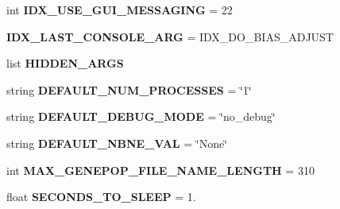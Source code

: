 \begin{DoxyCompactItemize}
\item 
int {\bfseries I\+D\+X\+\_\+\+U\+S\+E\+\_\+\+G\+U\+I\+\_\+\+M\+E\+S\+S\+A\+G\+I\+NG} = 22\hypertarget{namespacenegui_1_1pgdriveneestimator_a9f0371fe88418d9b181d7235ca747e73}{}\label{namespacenegui_1_1pgdriveneestimator_a9f0371fe88418d9b181d7235ca747e73}

\item 
{\bfseries I\+D\+X\+\_\+\+L\+A\+S\+T\+\_\+\+C\+O\+N\+S\+O\+L\+E\+\_\+\+A\+RG} = I\+D\+X\+\_\+\+D\+O\+\_\+\+B\+I\+A\+S\+\_\+\+A\+D\+J\+U\+ST\hypertarget{namespacenegui_1_1pgdriveneestimator_a1060cbbc63450dda6b048c88965edadd}{}\label{namespacenegui_1_1pgdriveneestimator_a1060cbbc63450dda6b048c88965edadd}

\item 
list {\bfseries H\+I\+D\+D\+E\+N\+\_\+\+A\+R\+GS}
\item 
string {\bfseries D\+E\+F\+A\+U\+L\+T\+\_\+\+N\+U\+M\+\_\+\+P\+R\+O\+C\+E\+S\+S\+ES} = \char`\"{}1\char`\"{}\hypertarget{namespacenegui_1_1pgdriveneestimator_a725197609b22aa42422547cba22744d5}{}\label{namespacenegui_1_1pgdriveneestimator_a725197609b22aa42422547cba22744d5}

\item 
string {\bfseries D\+E\+F\+A\+U\+L\+T\+\_\+\+D\+E\+B\+U\+G\+\_\+\+M\+O\+DE} = \char`\"{}no\+\_\+debug\char`\"{}\hypertarget{namespacenegui_1_1pgdriveneestimator_a652b7622c1e97a7f7b199266ef9c6f01}{}\label{namespacenegui_1_1pgdriveneestimator_a652b7622c1e97a7f7b199266ef9c6f01}

\item 
string {\bfseries D\+E\+F\+A\+U\+L\+T\+\_\+\+N\+B\+N\+E\+\_\+\+V\+AL} = \char`\"{}None\char`\"{}\hypertarget{namespacenegui_1_1pgdriveneestimator_a4c995df3f6af3302739c307f3c744bac}{}\label{namespacenegui_1_1pgdriveneestimator_a4c995df3f6af3302739c307f3c744bac}

\item 
int {\bfseries M\+A\+X\+\_\+\+G\+E\+N\+E\+P\+O\+P\+\_\+\+F\+I\+L\+E\+\_\+\+N\+A\+M\+E\+\_\+\+L\+E\+N\+G\+TH} = 310\hypertarget{namespacenegui_1_1pgdriveneestimator_af3d0878b3846d376f070b3c94105ae27}{}\label{namespacenegui_1_1pgdriveneestimator_af3d0878b3846d376f070b3c94105ae27}

\item 
float {\bfseries S\+E\+C\+O\+N\+D\+S\+\_\+\+T\+O\+\_\+\+S\+L\+E\+EP} = 1.\hypertarget{namespacenegui_1_1pgdriveneestimator_a1913968722f6b6ec924ec220421cc2d2}{}\label{namespacenegui_1_1pgdriveneestimator_a1913968722f6b6ec924ec220421cc2d2}


\end{DoxyCompactItemize}
